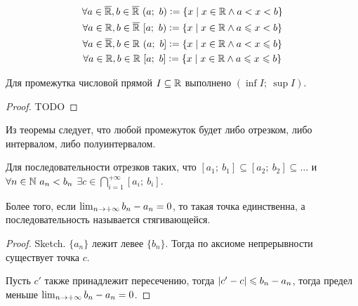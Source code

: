 \begin{gather}
    \forall a \in \overline{\mathbb{R}}, b \in \overline{\mathbb{R}}\ (a;\ b) \vcentcolon= \{x \;\vert\; x \in \mathbb{R} \land a < x < b \} \\
    \forall a \in \mathbb{R}, b \in \overline{\mathbb{R}}\ [a;\ b) \vcentcolon= \{x \;\vert\; x \in \mathbb{R} \land a \leqslant x < b \} \\
    \forall a \in \overline{\mathbb{R}}, b \in \mathbb{R}\ (a;\ b] \vcentcolon= \{x \;\vert\; x \in \mathbb{R} \land a < x \leqslant b \} \\
    \forall a \in \mathbb{R}, b \in \mathbb{R}\ [a;\ b] \vcentcolon= \{x \;\vert\; x \in \mathbb{R} \land a \leqslant x \leqslant b \}
\end{gather}

\begin{theorem}
    Для промежутка числовой прямой $I \subseteq \mathbb{R}$ выполнено $(\inf{I};\ \sup{I})$.
\end{theorem}
\begin{proof}
    TODO
\end{proof}

Из теоремы следует, что любой промежуток будет либо отрезком, либо интервалом, либо полуинтервалом.

\begin{theorem}
    Для последовательности отрезков таких, что $[a_1;\ b_1] \subseteq [a_2;\ b_2] \subseteq \ldots$ и $\forall n \in \mathbb{N}\ a_n < b_n$ $\exists c \in \bigcap_{i=1}^{+\infty} [a_i;\ b_i]$.

    Более того, если $\lim_{n\to+\infty} b_n - a_n =0$, то такая точка единственна, а последовательность называется стягивающейся.
\end{theorem}
\begin{proof}
    Sketch. $\{a_n\}$ лежит левее $\{b_n\}$. Тогда по аксиоме непрерывности существует точка $c$.

    Пусть $c'$ также принадлежит пересечению, тогда $\left\lvert c' - c \right\rvert \leqslant b_n - a_n$, тогда предел меньше $\lim_{n\to+\infty} b_n - a_n = 0$.
\end{proof}